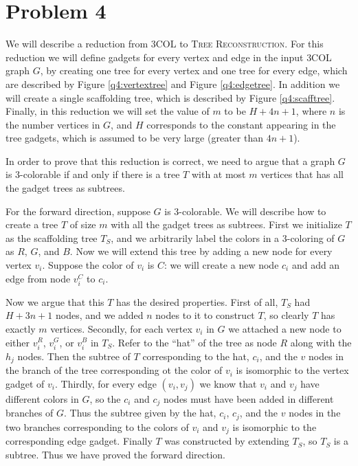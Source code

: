 \newcommand{\tr}{\textsc{Tree Reconstruction}\xspace}
\newcommand{\tc}{\textsc{3COL}\xspace}

\section*{Problem 4}

We will describe a reduction from \tc to \tr. For this reduction we
will define gadgets for every vertex and edge in the input \tc graph
$G$, by creating one tree for every vertex and one tree for every
edge, which are described by Figure \ref{q4:vertextree}
and Figure \ref{q4:edgetree}.
In addition we will create a single scaffolding tree, which is
described by Figure \ref{q4:scafftree}. Finally, in this
reduction we will set the value of $m$ to be $H + 4n + 1$,
where $n$ is the number vertices in $G$, and $H$ corresponds
to the constant appearing in the tree gadgets, which is assumed
to be very large (greater than $4n + 1$).

In order to prove that this reduction is correct, we need to argue
that a graph $G$ is 3-colorable if and only if there is a tree
$T$ with at most $m$ vertices that has all the gadget trees
as subtrees. 

For the forward direction, suppose $G$ is 3-colorable. We will
describe how to create a tree $T$ of size $m$ with all the gadget
trees as subtrees. First we initialize $T$ as the scaffolding
tree $T_S$, and we arbitrarily label the colors in a 3-coloring
of $G$ as $R$, $G$, and $B$. Now we will extend this tree
by adding a new node for every vertex $v_i$. Suppose the color
of $v_i$ is $C$: we will create a new node $c_i$ and
add an edge from node $v_i^C$ to $c_i$.

Now we argue that this $T$ has the desired properties.
First of all, $T_S$ had $H + 3n + 1$ nodes, and we 
added $n$ nodes to it to construct $T$, so clearly $T$
has exactly $m$ vertices.
Secondly, for each vertex $v_i$ in $G$ we attached a new node to
either $v_i^R$, $v_i^G$, or $v_i^B$ in $T_S$. Refer to the ``hat''
of the tree as node $R$ along with the $h_j$ nodes. Then
the subtree of $T$ corresponding to the hat, $c_i$, and
the $v$ nodes in the branch of the tree corresponding
ot the color of $v_i$ is isomorphic to the vertex gadget
of $v_i$. Thirdly, for every edge $(v_i, v_j)$ we know
that $v_i$ and $v_j$ have different colors in $G$, so
the $c_i$ and $c_j$ nodes must have been added in different
branches of $G$. Thus the subtree given by the hat, $c_i$,
$c_j$, and the $v$ nodes in the two branches corresponding to
the colors of $v_i$ and $v_j$ is isomorphic to the corresponding
edge gadget. Finally $T$ was constructed by extending $T_S$,
so $T_S$ is a subtree. Thus we have proved the forward
direction.

